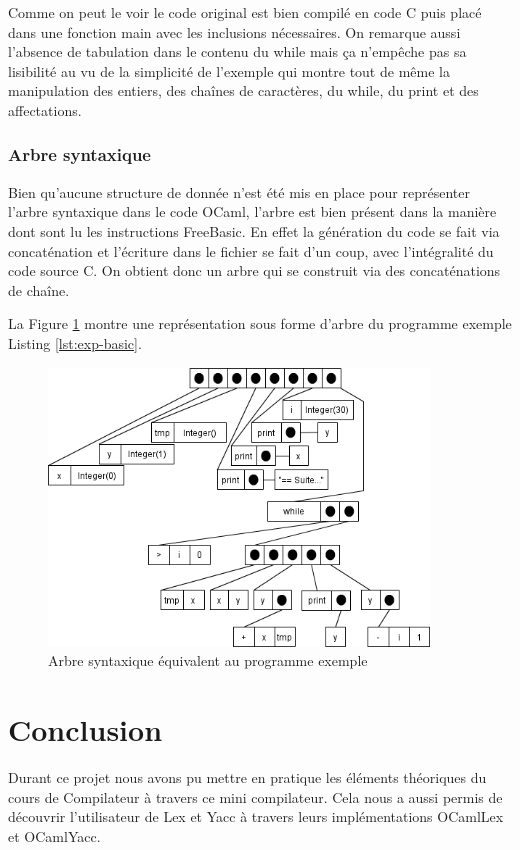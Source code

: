 \documentclass[french]{article}
\begin{document}
Comme on peut le voir le code original est bien compilé en code C puis placé dans une fonction main avec les inclusions nécessaires. On remarque aussi l'absence de tabulation dans le contenu du while mais ça n'empêche pas sa lisibilité au vu de la simplicité de l'exemple qui montre tout de même la manipulation des entiers, des chaînes de caractères, du while, du print et des affectations. 

\lstset{language=[Visual]Basic,caption=Exemple de programme en FreeBasic,label=lst:exp-basic}


\lstset{language=C,caption=Exemple compilé en C,label=lst:exp-c}


\section{Arbre syntaxique}

Bien qu'aucune structure de donnée n'est été mis en place pour représenter l'arbre syntaxique dans le code OCaml, l'arbre est bien présent dans la manière dont sont lu les instructions FreeBasic. En effet la génération du code se fait via concaténation et l'écriture dans le fichier se fait d'un coup, avec l'intégralité du code source C. On obtient donc un arbre qui se construit via des concaténations de chaîne.

La Figure \ref{fig:ast} montre une représentation sous forme d'arbre du programme exemple Listing \ref{lst:exp-basic}.

\begin{figure}[h]
    \centering
    \includegraphics[width=0.9\textwidth]{res/ast.png}
    \caption{Arbre syntaxique équivalent au programme exemple}
    \label{fig:ast}
\end{figure}

\part{Conclusion}

Durant ce projet nous avons pu mettre en pratique les éléments théoriques du cours de Compilateur à travers ce mini compilateur. Cela nous a aussi permis de découvrir l'utilisateur de Lex et Yacc à travers leurs implémentations OCamlLex et OCamlYacc.
\end{document}
